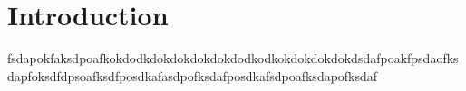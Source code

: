 \chapter{Introduction}
fsdapokfaksdpoafkokdodkdokdokdokdokdodkodkokdokdokdokdsdafpoakfpsdaofksdapfoksdfdpsoafksdfposdkafasdpofksdafposdkafsdpoafksdapofksdaf
